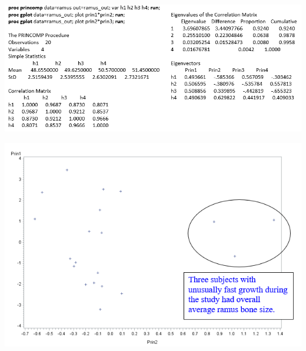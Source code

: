 \documentclass[
  9pt,
  ignorenonframetext,
]{beamer}
\begin{document}
\begin{frame}{}
\protect\hypertarget{section-17}{}
\tiny

\begin{center}\includegraphics[width=0.4\linewidth]{figs_L2/f22} \end{center}

\tiny

\tiny

\begin{center}\includegraphics[width=0.4\linewidth]{figs_L2/f21} \end{center}

\tiny
\end{frame}
\end{document}

